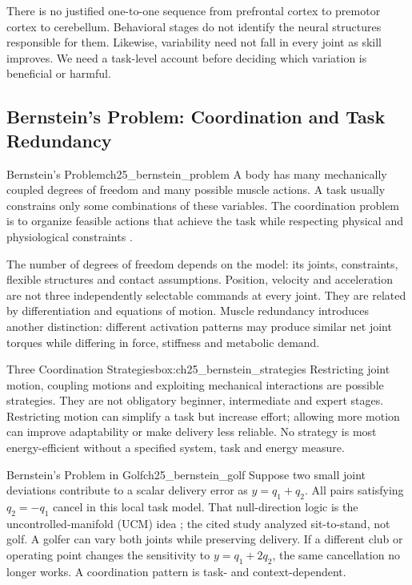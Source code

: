 There is no justified one-to-one sequence from prefrontal cortex to premotor cortex to cerebellum. Behavioral stages do not identify the neural structures responsible for them. Likewise, variability need not fall in every joint as skill improves. We need a task-level account before deciding which variation is beneficial or harmful.

\subsection{Bernstein's Problem: Coordination and Task Redundancy}
\label{subsec:ch25_bernstein}

\begin{definition}{Bernstein's Problem}{ch25_bernstein_problem}
A body has many mechanically coupled degrees of freedom and many possible muscle actions. A task usually constrains only some combinations of these variables. The coordination problem is to organize feasible actions that achieve the task while respecting physical and physiological constraints \citep{bernstein1967coordination}.
\end{definition}

The number of degrees of freedom depends on the model: its joints, constraints, flexible structures and contact assumptions. Position, velocity and acceleration are not three independently selectable commands at every joint. They are related by differentiation and equations of motion. Muscle redundancy introduces another distinction: different activation patterns may produce similar net joint torques while differing in force, stiffness and metabolic demand.

\begin{principle}{Three Coordination Strategies}{box:ch25_bernstein_strategies}
Restricting joint motion, coupling motions and exploiting mechanical interactions are possible strategies. They are not obligatory beginner, intermediate and expert stages. Restricting motion can simplify a task but increase effort; allowing more motion can improve adaptability or make delivery less reliable. No strategy is most energy-efficient without a specified system, task and energy measure.
\end{principle}

\begin{example}{Bernstein's Problem in Golf}{ch25_bernstein_golf}
Suppose two small joint deviations contribute to a scalar delivery error as $y=q_1+q_2$. All pairs satisfying $q_2=-q_1$ cancel in this local task model. That null-direction logic is the uncontrolled-manifold (UCM) idea \citep{Scholz1999}; the cited study analyzed sit-to-stand, not golf. A golfer can vary both joints while preserving delivery. If a different club or operating point changes the sensitivity to $y=q_1+2q_2$, the same cancellation no longer works. A coordination pattern is task- and context-dependent.
\end{example}


